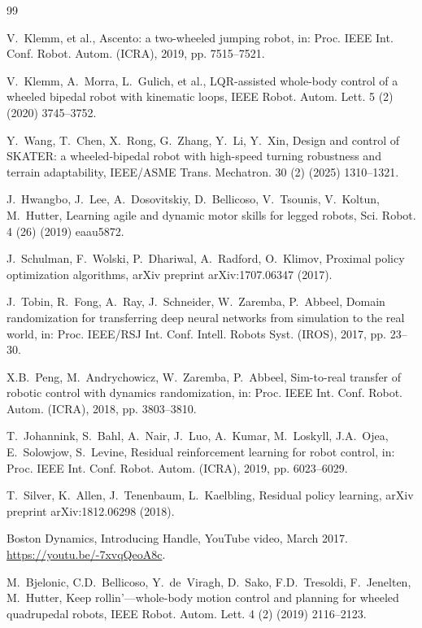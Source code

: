 \documentclass[a4paper,fleqn]{cas-dc}
\begin{document}
\begin{thebibliography}{99}
\setlength{\itemsep}{0pt}
\setlength{\parsep}{0pt}
\setlength{\topsep}{0pt}

V.~Klemm, et al., Ascento: a two-wheeled jumping robot, in: Proc. IEEE Int.
Conf. Robot. Autom. (ICRA), 2019, pp. 7515--7521.

V.~Klemm, A.~Morra, L.~Gulich, et al., LQR-assisted whole-body control of a
wheeled bipedal robot with kinematic loops, IEEE Robot. Autom. Lett. 5 (2)
(2020) 3745--3752.

Y.~Wang, T.~Chen, X.~Rong, G.~Zhang, Y.~Li, Y.~Xin, Design and control of
SKATER: a wheeled-bipedal robot with high-speed turning robustness and terrain
adaptability, IEEE/ASME Trans. Mechatron. 30 (2) (2025) 1310--1321.

J.~Hwangbo, J.~Lee, A.~Dosovitskiy, D.~Bellicoso, V.~Tsounis, V.~Koltun,
M.~Hutter, Learning agile and dynamic motor skills for legged robots, Sci.
Robot. 4 (26) (2019) eaau5872.

J.~Schulman, F.~Wolski, P.~Dhariwal, A.~Radford, O.~Klimov, Proximal policy
optimization algorithms, arXiv preprint arXiv:1707.06347 (2017).

J.~Tobin, R.~Fong, A.~Ray, J.~Schneider, W.~Zaremba, P.~Abbeel, Domain
randomization for transferring deep neural networks from simulation to the real
world, in: Proc. IEEE/RSJ Int. Conf. Intell. Robots Syst. (IROS), 2017, pp.
23--30.

X.B.~Peng, M.~Andrychowicz, W.~Zaremba, P.~Abbeel, Sim-to-real transfer of
robotic control with dynamics randomization, in: Proc. IEEE Int. Conf. Robot.
Autom. (ICRA), 2018, pp. 3803--3810.

T.~Johannink, S.~Bahl, A.~Nair, J.~Luo, A.~Kumar, M.~Loskyll, J.A.~Ojea,
E.~Solowjow, S.~Levine, Residual reinforcement learning for robot control, in:
Proc. IEEE Int. Conf. Robot. Autom. (ICRA), 2019, pp. 6023--6029.

T.~Silver, K.~Allen, J.~Tenenbaum, L.~Kaelbling, Residual policy learning,
arXiv preprint arXiv:1812.06298 (2018).

Boston Dynamics, Introducing Handle, YouTube video, March 2017.
\url{https://youtu.be/-7xvqQeoA8c}.

M.~Bjelonic, C.D.~Bellicoso, Y.~de~Viragh, D.~Sako, F.D.~Tresoldi,
F.~Jenelten, M.~Hutter, Keep rollin'---whole-body motion control and planning
for wheeled quadrupedal robots, IEEE Robot. Autom. Lett. 4 (2) (2019)
2116--2123.


\end{thebibliography}
\end{document}
